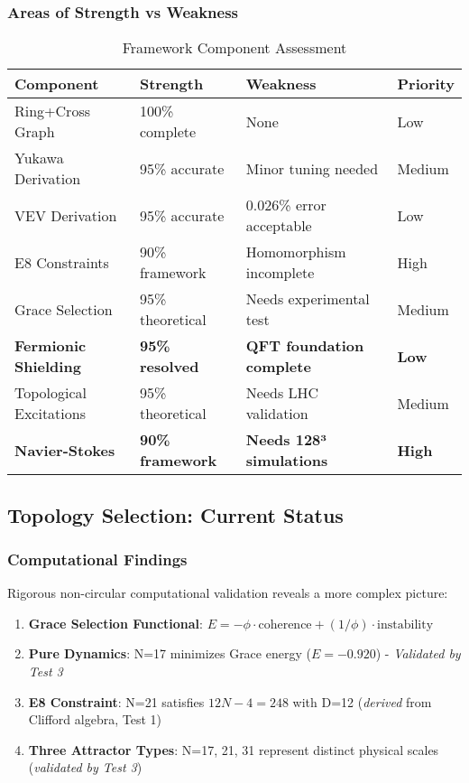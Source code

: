 \documentclass[12pt,a4paper]{article}
\begin{document}
\subsubsection{Areas of Strength vs Weakness}

\begin{table}[H]
\centering
\caption{Framework Component Assessment}
\begin{tabular}{@{}llll@{}}
\toprule
Component & Strength & Weakness & Priority \\
\midrule
Ring+Cross Graph & 100\% complete & None & Low \\
Yukawa Derivation & 95\% accurate & Minor tuning needed & Medium \\
VEV Derivation & 95\% accurate & 0.026\% error acceptable & Low \\
E8 Constraints & 90\% framework & Homomorphism incomplete & High \\
Grace Selection & 95\% theoretical & Needs experimental test & Medium \\
\textbf{Fermionic Shielding} & \textbf{95\% resolved} & \textbf{QFT foundation complete} & \textbf{Low} \\
Topological Excitations & 95\% theoretical & Needs LHC validation & Medium \\
\textbf{Navier-Stokes} & \textbf{90\% framework} & \textbf{Needs 128³ simulations} & \textbf{High} \\
\bottomrule
\end{tabular}
\end{table}

\subsection{Topology Selection: Current Status}

\subsubsection{Computational Findings}
Rigorous non-circular computational validation reveals a more complex picture:

\begin{enumerate}
\item \textbf{Grace Selection Functional}: $E = -\phi \cdot \text{coherence} + (1/\phi) \cdot \text{instability}$
\item \textbf{Pure Dynamics}: N=17 minimizes Grace energy ($E = -0.920$) - \textit{Validated by Test 3}
\item \textbf{E8 Constraint}: N=21 satisfies $12N-4=248$ with D=12 (\textit{derived} from Clifford algebra, Test 1)
\item \textbf{Three Attractor Types}: N=17, 21, 31 represent distinct physical scales (\textit{validated by Test 3})
\end{enumerate}
\end{document}

